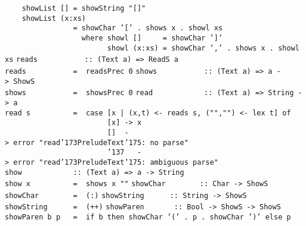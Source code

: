 \mbox{\tt \ \ \ \ showList\ []\ =\ showString\ "[]"}\\
\mbox{\tt \ \ \ \ showList\ (x:xs)}\\
\mbox{\tt \ \ \ \ \ \ \ \ \ \ \ \ \ \ \ \ =\ showChar\ '['\ .\ shows\ x\ .\ showl\ xs}\\
\mbox{\tt \ \ \ \ \ \ \ \ \ \ \ \ \ \ \ \ \ \ where\ showl\ []\ \ \ \ \ =\ showChar\ ']'}\\
\mbox{\tt \ \ \ \ \ \ \ \ \ \ \ \ \ \ \ \ \ \ \ \ \ \ \ \ showl\ (x:xs)\ =\ showChar\ ','\ .\ shows\ x\ .\ showl\ xs}
%
%
%
%
%
\eprogB\noindent\bprogB
\mbox{\tt reads\ \ \ \ \ \ \ \ \ \ \ ::\ (Text\ a)\ =>\ ReadS\ a}\\
\mbox{\tt reads\ \ \ \ \ \ \ \ \ \ \ =\ \ readsPrec\ 0}
%
\eprogB\noindent\bprogB
\mbox{\tt shows\ \ \ \ \ \ \ \ \ \ \ ::\ (Text\ a)\ =>\ a\ ->\ ShowS}\\
\mbox{\tt shows\ \ \ \ \ \ \ \ \ \ \ =\ \ showsPrec\ 0}
%
\eprogB\noindent\bprogB
\mbox{\tt read\ \ \ \ \ \ \ \ \ \ \ \ ::\ (Text\ a)\ =>\ String\ ->\ a}\\
\mbox{\tt read\ s\ \ \ \ \ \ \ \ \ \ =\ \ case\ [x\ |\ (x,t)\ <-\ reads\ s,\ ("","")\ <-\ lex\ t]\ of}\\
\mbox{\tt \ \ \ \ \ \ \ \ \ \ \ \ \ \ \ \ \ \ \ \ \ \ \ \ [x]\ ->\ x}\\
\mbox{\tt \ \ \ \ \ \ \ \ \ \ \ \ \ \ \ \ \ \ \ \ \ \ \ \ []\ \ ->\ error\ "read{\char'173}PreludeText{\char'175}:\ no\ parse"}\\
\mbox{\tt \ \ \ \ \ \ \ \ \ \ \ \ \ \ \ \ \ \ \ \ \ \ \ \ {\char'137}\ \ \ ->\ error\ "read{\char'173}PreludeText{\char'175}:\ ambiguous\ parse"}
%
\eprogB\noindent\bprogB
\mbox{\tt show\ \ \ \ \ \ \ \ \ \ \ \ ::\ (Text\ a)\ =>\ a\ ->\ String}\\
\mbox{\tt show\ x\ \ \ \ \ \ \ \ \ \ =\ \ shows\ x\ ""}
%
\eprogB\noindent\bprogB
\mbox{\tt showChar\ \ \ \ \ \ \ \ ::\ Char\ ->\ ShowS}\\
\mbox{\tt showChar\ \ \ \ \ \ \ \ =\ \ (:)}
%
\eprogB\noindent\bprogB
\mbox{\tt showString\ \ \ \ \ \ ::\ String\ ->\ ShowS}\\
\mbox{\tt showString\ \ \ \ \ \ =\ \ (++)}
%
\eprogB\noindent\bprogB
\mbox{\tt showParen\ \ \ \ \ \ \ ::\ Bool\ ->\ ShowS\ ->\ ShowS}\\
\mbox{\tt showParen\ b\ p\ \ \ =\ \ if\ b\ then\ showChar\ '('\ .\ p\ .\ showChar\ ')'\ else\ p}
